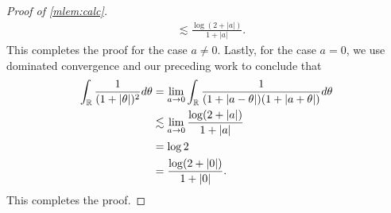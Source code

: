 \begin{proof}[Proof of \cref{mlem:calc}]
\begin{equation*}
\begin{split}
		& \lesssim \frac{\log(2 + | a |)}{1 + | a |}.
	\end{split}
\end{equation*}
%
%
This completes the proof for the case $a \neq 0$. Lastly, for the case
$a =0$, we use dominated convergence and our preceding work to
conclude that
%
%
\begin{equation*}
	\begin{split}
		\int_{\mathbb{R}} \frac{1}{(1 + | \theta|)^2} d \theta
		& = \lim_{a \to 0}
		\int_{\mathbb{R}} \frac{1}{(1 + | a - \theta |)(1 + | a + \theta |)}d \theta
		\\
		& \lesssim \lim_{a \to 0} \frac{\log(2 + | a |)}{1 + | a |}
		\\
		& =  \log 2
		\\
		& = \frac{\log(2 + | 0 |)}{1 + | 0 |}. 
	\end{split}
\end{equation*}
%
This completes the proof. 
\end{proof}
%

